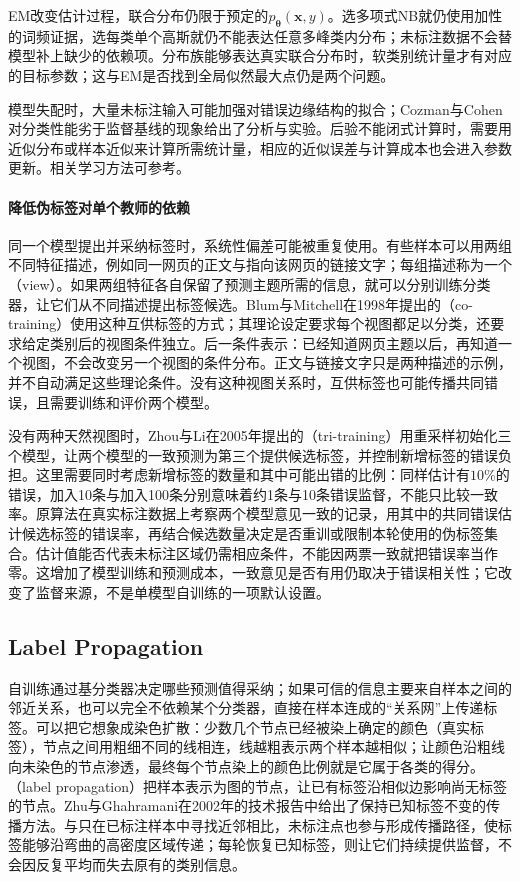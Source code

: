 EM改变估计过程，联合分布仍限于预定的$p_{\bm\theta}(\bm x,y)$。选多项式NB就仍使用加性的词频证据，选每类单个高斯就仍不能表达任意多峰类内分布；未标注数据不会替模型补上缺少的依赖项。分布族能够表达真实联合分布时，软类别统计量才有对应的目标参数；这与EM是否找到全局似然最大点仍是两个问题。

模型失配时，大量未标注输入可能加强对错误边缘结构的拟合；Cozman与Cohen对分类性能劣于监督基线的现象给出了分析与实验。后验不能闭式计算时，需要用近似分布或样本近似来计算所需统计量，相应的近似误差与计算成本也会进入参数更新。相关学习方法可参考。

\paragraph{降低伪标签对单个教师的依赖}
同一个模型提出并采纳标签时，系统性偏差可能被重复使用。有些样本可以用两组不同特征描述，例如同一网页的正文与指向该网页的链接文字；每组描述称为一个（view）。如果两组特征各自保留了预测主题所需的信息，就可以分别训练分类器，让它们从不同描述提出标签候选。Blum与Mitchell在1998年提出的（co-training）使用这种互供标签的方式；其理论设定要求每个视图都足以分类，还要求给定类别后的视图条件独立。后一条件表示：已经知道网页主题以后，再知道一个视图，不会改变另一个视图的条件分布。正文与链接文字只是两种描述的示例，并不自动满足这些理论条件。没有这种视图关系时，互供标签也可能传播共同错误，且需要训练和评价两个模型。

没有两种天然视图时，Zhou与Li在2005年提出的（tri-training）用重采样初始化三个模型，让两个模型的一致预测为第三个提供候选标签，并控制新增标签的错误负担。这里需要同时考虑新增标签的数量和其中可能出错的比例：同样估计有$10\%$的错误，加入10条与加入100条分别意味着约1条与10条错误监督，不能只比较一致率。原算法在真实标注数据上考察两个模型意见一致的记录，用其中的共同错误估计候选标签的错误率，再结合候选数量决定是否重训或限制本轮使用的伪标签集合。估计值能否代表未标注区域仍需相应条件，不能因两票一致就把错误率当作零。这增加了模型训练和预测成本，一致意见是否有用仍取决于错误相关性；它改变了监督来源，不是单模型自训练的一项默认设置。

\subsection{Label Propagation}
\label{sec:classification-label-propagation}

自训练通过基分类器决定哪些预测值得采纳；如果可信的信息主要来自样本之间的邻近关系，也可以完全不依赖某个分类器，直接在样本连成的“关系网”上传递标签。可以把它想象成染色扩散：少数几个节点已经被染上确定的颜色（真实标签），节点之间用粗细不同的线相连，线越粗表示两个样本越相似；让颜色沿粗线向未染色的节点渗透，最终每个节点染上的颜色比例就是它属于各类的得分。（label propagation）把样本表示为图的节点，让已有标签沿相似边影响尚无标签的节点。Zhu与Ghahramani在2002年的技术报告中给出了保持已知标签不变的传播方法。与只在已标注样本中寻找近邻相比，未标注点也参与形成传播路径，使标签能够沿弯曲的高密度区域传递；每轮恢复已知标签，则让它们持续提供监督，不会因反复平均而失去原有的类别信息。


